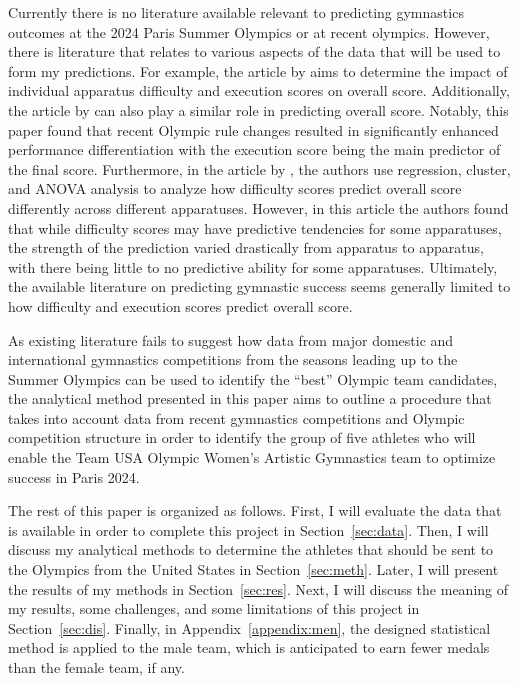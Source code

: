\documentclass[12pt]{article}
\begin{document}
Currently there is no literature available relevant to predicting gymnastics outcomes at the 2024 
Paris Summer Olympics or at recent olympics. However, there is literature that relates to various aspects of 
the data that will be used to form my predictions. For example, the article by \citet{ScienceOfGymnastics2021} aims to determine the 
impact of individual apparatus difficulty and execution scores on overall score. 
 Additionally, the article by \citet{JonasRohleder2023} 
can also play a similar role in predicting overall 
score. Notably, this paper found that recent Olympic rule changes resulted in significantly enhanced performance 
differentiation with the execution score being the main predictor of the final score. 
Furthermore, in the article by \citet{ApparatusDifficulty2010}, the authors use regression, cluster, and ANOVA analysis to 
analyze how difficulty scores predict overall score differently across different apparatuses. However, in this 
article the authors found that while difficulty scores may have predictive tendencies for some apparatuses, 
the strength of the prediction varied drastically from apparatus to apparatus, with there being little to no 
predictive ability for some apparatuses. Ultimately, the available literature on predicting 
gymnastic success seems generally limited to how difficulty and execution scores predict overall score.


As existing literature fails to suggest how data from major domestic and international gymnastics competitions 
from the seasons leading up to the Summer Olympics can be used to identify the ``best'' Olympic team candidates, 
the analytical method presented in this paper aims to outline a procedure that takes into account data from recent 
gymnastics competitions and Olympic competition structure in order to identify the group of five athletes who will 
enable the Team USA Olympic Women’s Artistic Gymnastics team to optimize success in Paris 2024. 

The rest of this paper is organized as follows. First, I will evaluate the data that is available in order to complete 
this project in Section~\ref{sec:data}. Then, I will discuss my 
analytical methods to determine the athletes that should be sent to the Olympics from the United States 
in Section~\ref{sec:meth}. Later, I will present the results of my 
methods in Section~\ref{sec:res}. Next, I will discuss the meaning of my results, some challenges, 
and some limitations of this project in Section~\ref{sec:dis}. Finally, in  Appendix~\ref{appendix:men}, the designed statistical 
method is applied to the male team, which is anticipated to earn fewer medals than the female team, if any.
\end{document}
